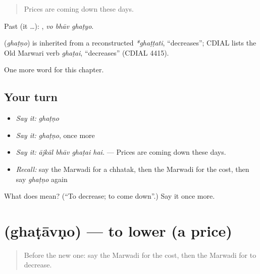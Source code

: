\begin{quote}
Prices are coming down these days.
\end{quote}

Past (it …):   , \emph{vo bhāv ghaṭyo}.

\begin{cousinweb}
\textbf{} (\emph{ghaṭṇo}) is inherited from a reconstructed \emph{*ghaṭṭati}, \textquotedblleft{}decreases\textquotedblright{}; CDIAL lists the Old Marwari verb \emph{ghaṭai}, \textquotedblleft{}decreases\textquotedblright{} (CDIAL 4415).
\end{cousinweb}

\begin{grammarlens}[title={What you've built}]
One more word for this chapter.
\end{grammarlens}

\subsection*{Your turn}
\begin{itemize}
\raggedright
  \item \emph{Say it:} \emph{ghaṭṇo}
  \item \emph{Say it:} \emph{ghaṭṇo}, once more
  \item \emph{Say it:} \emph{ājkāl bhāv ghaṭai hai.} — Prices are coming down these days.
  \item \emph{Recall:} say the Marwadi for a chhatak, then the Marwadi for the cost, then say \emph{ghaṭṇo} again
\end{itemize}

\begin{tcolorbox}[breakable,colback=teal!4,colframe=teal!35!black,title={Before you move on}]
What does  mean? (\textquotedblleft{}To decrease; to come down\textquotedblright{}.) Say it once more.
\end{tcolorbox}
\section[\texorpdfstring{\mw{घटावणो} (ghaṭāvṇo)}{घटावणो (ghaṭāvṇo)}]{ (ghaṭāvṇo) — to lower (a price)}

\label{lesson:MW-C213-ghatavno}



\begin{quote}
Before the new one: say the Marwadi for the cost, then the Marwadi for to decrease.
\end{quote}

